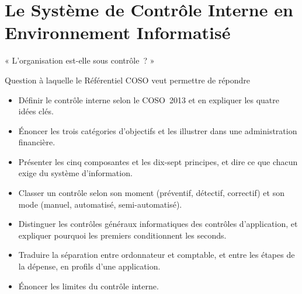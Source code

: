 
\chapter{Le Système de Contrôle Interne en Environnement Informatisé}
\label{chap:sci}

\epigraph{%
    « L'organisation est-elle sous contrôle~? »%
}{Question à laquelle le Référentiel COSO veut permettre de répondre}


\begin{boxobjectifs}
\begin{itemize}
    \item Définir le contrôle interne selon le COSO~2013 et en expliquer
          les quatre idées clés.
    \item Énoncer les trois catégories d'objectifs et les illustrer dans
          une administration financière.
    \item Présenter les cinq composantes et les dix-sept principes, et dire
          ce que chacun exige du système d'information.
    \item Classer un contrôle selon son moment (préventif, détectif,
          correctif) et son mode (manuel, automatisé, semi-automatisé).
    \item Distinguer les contrôles généraux informatiques des contrôles
          d'application, et expliquer pourquoi les premiers conditionnent
          les seconds.
    \item Traduire la séparation entre ordonnateur et comptable, et entre
          les étapes de la dépense, en profils d'une application.
    \item Énoncer les limites du contrôle interne.
\end{itemize}
\end{boxobjectifs}

